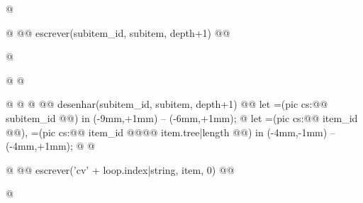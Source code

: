 \documentclass[11pt]{article}
\begin{document}
@%
\begin{adjustwidth}{1.5em}{}%
@%
@@ escrever(subitem_id, subitem, depth+1) @@

@%
\end{adjustwidth}%
@%
@%

@%
@%
@%
@@ desenhar(subitem_id, subitem, depth+1) @@%
 let =(pic cs:@@ subitem_id @@) in ({-9mm,+1mm}) -- (-6mm,+1mm);
@%
 let =(pic cs:@@ item_id @@), =(pic cs:@@ item_id @@@@ item.tree|length @@) in ({-4mm,-1mm}) -- ({-4mm,+1mm});
@%
@%


\medskip
\begin{adjustwidth}{1.5em}{}%
@%
\filbreak
@@ escrever('cv' + loop.index|string, item, 0) @@
%
@%
\end{adjustwidth}%
\end{document}
